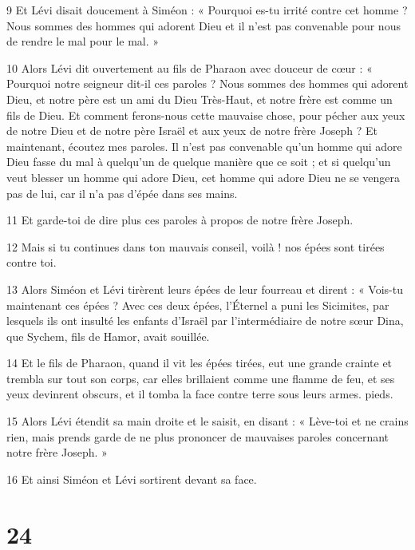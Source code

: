 \par 9 Et Lévi disait doucement à Siméon : « Pourquoi es-tu irrité contre cet homme ? Nous sommes des hommes qui adorent Dieu et il n’est pas convenable pour nous de rendre le mal pour le mal. »

\par 10 Alors Lévi dit ouvertement au fils de Pharaon avec douceur de cœur : « Pourquoi notre seigneur dit-il ces paroles ? Nous sommes des hommes qui adorent Dieu, et notre père est un ami du Dieu Très-Haut, et notre frère est comme un fils de Dieu. Et comment ferons-nous cette mauvaise chose, pour pécher aux yeux de notre Dieu et de notre père Israël et aux yeux de notre frère Joseph ? Et maintenant, écoutez mes paroles. Il n'est pas convenable qu'un homme qui adore Dieu fasse du mal à quelqu'un de quelque manière que ce soit ; et si quelqu'un veut blesser un homme qui adore Dieu, cet homme qui adore Dieu ne se vengera pas de lui, car il n'a pas d'épée dans ses mains.

\par 11 Et garde-toi de dire plus ces paroles à propos de notre frère Joseph.

\par 12 Mais si tu continues dans ton mauvais conseil, voilà ! nos épées sont tirées contre toi.

\par 13 Alors Siméon et Lévi tirèrent leurs épées de leur fourreau et dirent : « Vois-tu maintenant ces épées ? Avec ces deux épées, l'Éternel a puni les Sicimites, par lesquels ils ont insulté les enfants d'Israël par l'intermédiaire de notre sœur Dina, que Sychem, fils de Hamor, avait souillée.

\par 14 Et le fils de Pharaon, quand il vit les épées tirées, eut une grande crainte et trembla sur tout son corps, car elles brillaient comme une flamme de feu, et ses yeux devinrent obscurs, et il tomba la face contre terre sous leurs armes. pieds.

\par 15 Alors Lévi étendit sa main droite et le saisit, en disant : « Lève-toi et ne crains rien, mais prends garde de ne plus prononcer de mauvaises paroles concernant notre frère Joseph. »

\par 16 Et ainsi Siméon et Lévi sortirent devant sa face.

\chapter{24}

